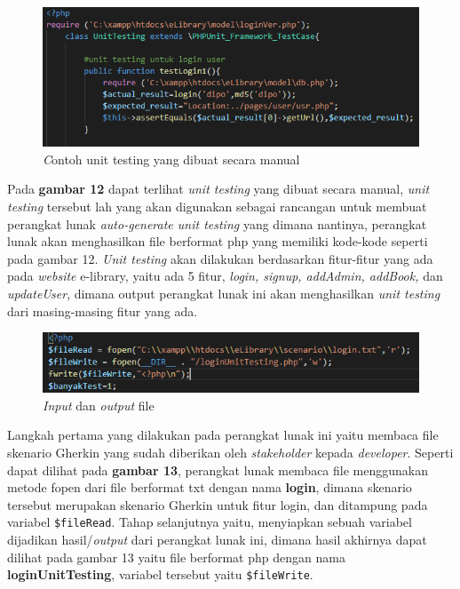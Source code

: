 \documentclass[a4paper,twoside]{article}
\begin{document}
\begin{enumerate}
\begin{figure}[h!]
			\includegraphics[scale=1.00]{../DokumenSkripsi/gambar/implementasi1}
			\centering
			\caption{\textit Contoh {unit testing} yang dibuat secara manual}
		\end{figure}
Pada \textbf{gambar 12} dapat terlihat \textit{unit testing} yang dibuat secara manual, \textit{unit testing} tersebut lah yang akan digunakan sebagai rancangan untuk membuat perangkat lunak \textit{auto-generate unit testing} yang dimana nantinya, perangkat lunak akan menghasilkan file berformat php yang memiliki kode-kode seperti pada gambar 12. \textit{Unit testing} akan dilakukan berdasarkan fitur-fitur yang ada pada \textit{website} e-library, yaitu ada 5 fitur, \textit{login, signup, addAdmin, addBook, }dan \textit{updateUser}, dimana output perangkat lunak ini akan menghasilkan \textit{unit testing} dari masing-masing fitur yang ada.

\begin{figure}[h!]
			\includegraphics[scale=1.00]{../DokumenSkripsi/gambar/implementasi2}
			\centering
			\caption{\textit \textit{Input} dan \textit{output} file}
		\end{figure}

Langkah pertama yang dilakukan pada perangkat lunak ini yaitu membaca file skenario Gherkin yang sudah diberikan oleh \textit{stakeholder} kepada \textit{developer}. Seperti dapat dilihat pada \textbf{gambar 13}, perangkat lunak membaca file menggunakan metode fopen dari file berformat txt dengan nama \textbf{login}, dimana skenario tersebut merupakan skenario Gherkin untuk fitur login, dan ditampung pada variabel \texttt{\$fileRead}. Tahap selanjutnya yaitu, menyiapkan sebuah variabel dijadikan hasil/\textit{output} dari perangkat lunak ini, dimana hasil akhirnya dapat dilihat pada gambar 13 yaitu file berformat php dengan nama \textbf{loginUnitTesting}, variabel tersebut yaitu \texttt{\$fileWrite}.


\end{enumerate}
\end{document}
